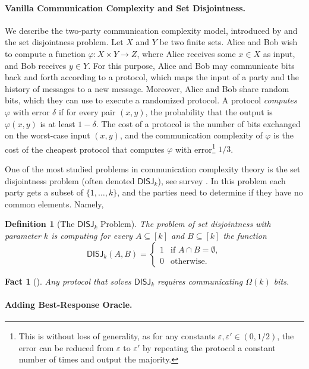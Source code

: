 \documentclass[11pt]{article}
\newtheorem{definition}{Definition}
\newtheorem{fact}{Fact}
\newcommand{\eps}{\varepsilon}
\newcommand{\DISJ}[1]{\mathsf{DISJ}_{#1}}
\begin{document}
\paragraph{{Vanilla} Communication Complexity and Set Disjointness.}
We describe the two-party communication complexity model, introduced by \cite{yao1979some} and the set disjointness problem.
Let $X$ and $Y$ be two finite sets. Alice and Bob wish to compute a function $\varphi: X \times Y \to Z$, where Alice receives some $x \in X$ as input, and Bob receives $y \in Y$.
For this purpose, Alice and Bob may communicate bits back and forth according to a protocol, which maps the input of a party and the history of messages to a new message. 
Moreover, Alice and Bob share random bits, which they can use to execute a randomized protocol.
A protocol \textit{computes} $\varphi$ with error $\delta$ if for every pair $(x,y)$, the probability that the output is $\varphi(x,y)$ is at least $1-\delta$.
The cost of a protocol is the number of bits exchanged on the worst-case input $(x,y)$, and the communication complexity of $\varphi$ is the cost of the cheapest protocol that computes $\varphi$ with error\footnote{This is without loss of generality, as for any constants $\eps,\eps' \in (0,1/2)$, the error can be reduced from $\eps$ to $\eps'$ by repeating the protocol a constant number of times and output the majority.} $1/3$.

One of the most studied problems in communication complexity theory is the set disjointness problem (often denoted $\DISJ{k}$), see survey \cite{sherstov2014communication}.
In this problem each party gets a subset of $\{1,\dots,k\}$, and the parties need to determine if they have no common elements. Namely,
\begin{definition}[The $\DISJ{k}$ Problem]\label{def:disjointness}
    The problem of set disjointness with parameter $k$ is computing for every $A \subseteq [k]$ and $B \subseteq [k]$ the function
    $$
    \DISJ{k}(A,B) = \begin{cases}
        1 & \text{if } A \cap B = \emptyset, \\
        0 & \text{otherwise.} 
    \end{cases}
    $$
\end{definition}
\begin{fact}[\cite{kalyanasundaram1992probabilistic, Razborov92}]
    Any protocol that solves $\DISJ{k}$ requires communicating $\Omega(k)$ bits.
\end{fact}

\paragraph{Adding Best-Response Oracle.}
\end{document}
